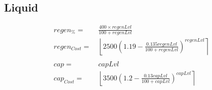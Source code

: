         \subsection{Liquid}
            \begin{align*}
                regen_\% = &\  \frac{400 \times regenLvl}{100+regenLvl}
                \\ 
                regen_{Cost} = &\ 
                    \left\lfloor 
                        2500\left(1.19-\frac{0.135regenLvl}{100+regenLvl}\right)^{regenLvl}
                    \right\rceil 
                \\ 
                \\
                cap = &\ capLvl
                \\ 
                cap_{Cost} = &\ 
                    \left\lfloor 
                        3500\left(1.2-\frac{0.13capLvl}{100+capLvl}\right)^{capLvl}
                    \right\rceil 
            \end{align*}
